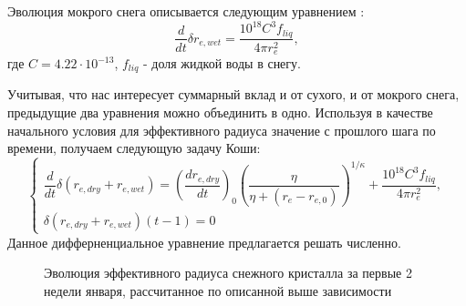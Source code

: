 \documentclass[a4paper, fontsize=14pt]{scrartcl}
\begin{document}
Эволюция мокрого снега описывается следующим уравнением \cite{CLM4.5tech}:
\begin{equation}
\dfrac{d}{dt} \delta r_{e , wet} = \dfrac{10^{18} C^3 f_{liq}} {4 \pi r_{e}^2}, \label{sys}
\end{equation}
где $C = 4.22 \cdot 10^{-13}$, $f_{liq}$ - доля жидкой воды в снегу.

Учитывая, что нас интересует суммарный вклад и от сухого, и от мокрого снега, предыдущие два уравнения можно объединить в одно. Используя в качестве начального условия для эффективного радиуса значение с прошлого шага по времени, получаем следующую задачу Коши:
\begin{equation}
    \begin{cases}
        \dfrac{d}{dt} \delta (r_{e , dry} + r_{e , wet}) = {\left( \dfrac{dr_{e , dry}}{dt} \right)}_0 \left(\dfrac{\eta}{\eta + (r_e - r_{e, 0})}\right)^{1 / \kappa} + \dfrac{10^{18} C^3 f_{liq}} {4 \pi r_{e}^2} ,
        \\
        \delta (r_{e , dry} + r_{e , wet})(t-1) = 0
    \end{cases} \label{sys}
\end{equation}
Данное дифферненциальное уравнение предлагается решать численно.

\begin{figure}[h]
    \caption{Эволюция эффективного радиуса снежного кристалла за первые 2 недели января, рассчитанное по описанной выше зависимости}
    \label{fig:image}
\end{figure}
 
\end{document}

